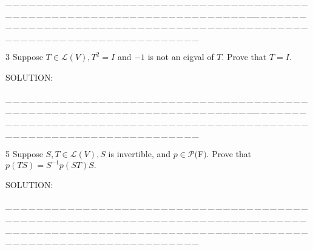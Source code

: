 \documentclass[a4paper, 11pt, UTF8]{article}
\def\Lm{\mathcal{L}}
\def\Po{\mathcal{P}}
\begin{document}
\begin{large}
\par
{\tiny \_\,\_\,\_\,\_\,\_\,\_\,\_\,\_\,\_\,\_\,\_\,\_\,\_\,\_\,\_\,\_\,\_\,\_\,\_\,\_\,\_\,\_\,\_\,\_\,\_\,\_\,\_\,\_\,\_\,\_\,\_\,\_\,\_\,\_\,\_\,\_\,\_\,\_\,\_\,\_\,\_\,\_\,\_\,\_\,\_\,\_\,\_\,\_\,\_\,\_\,\_\,\_\,\_\,\_\,\_\,\_\,\_\,\_\,\_\,\_\,\_\,\_\,\_\,\_\,\_\,\_\,\_\,\_\,\_\,\_\,\_\_\,\_\,\_\,\_\,\_\,\_\,\_\,\_\,\_\,\_\,\_\,\_\,\_\,\_\,\_\,\_\,\_\,\_\,\_\,\_\,\_\,\_\,\_\,\_\,\_\,\_\,\_\,\_\,\_\,\_\,\_\,\_\,\_\,\_\,\_\,\_\,\_\,\_\,\_\,\_\,\_\,\_\,\_\,\_\,\_\,\_\,\_\,\_\,\_\,\_\,\_\,\_\,\_\,\_\,\_\,\_\,\_\,\_\,\_\,\_\,\_\,\_\,\_\,\_\,\_\,\_\,\_\,\_\,\_\,\_\,\_}\par

{\timesbf\Large 3} {\timessl\Large 
Suppose $T\in\Lm(V),T^2=I$ and $-1$ is not an eigval of $T.$ Prove that $T=I.$
}\par
{\timesbf S\footnotesize{OLUTION:}}\par\quad

\par
{\tiny \_\,\_\,\_\,\_\,\_\,\_\,\_\,\_\,\_\,\_\,\_\,\_\,\_\,\_\,\_\,\_\,\_\,\_\,\_\,\_\,\_\,\_\,\_\,\_\,\_\,\_\,\_\,\_\,\_\,\_\,\_\,\_\,\_\,\_\,\_\,\_\,\_\,\_\,\_\,\_\,\_\,\_\,\_\,\_\,\_\,\_\,\_\,\_\,\_\,\_\,\_\,\_\,\_\,\_\,\_\,\_\,\_\,\_\,\_\,\_\,\_\,\_\,\_\,\_\,\_\,\_\,\_\,\_\,\_\,\_\,\_\_\,\_\,\_\,\_\,\_\,\_\,\_\,\_\,\_\,\_\,\_\,\_\,\_\,\_\,\_\,\_\,\_\,\_\,\_\,\_\,\_\,\_\,\_\,\_\,\_\,\_\,\_\,\_\,\_\,\_\,\_\,\_\,\_\,\_\,\_\,\_\,\_\,\_\,\_\,\_\,\_\,\_\,\_\,\_\,\_\,\_\,\_\,\_\,\_\,\_\,\_\,\_\,\_\,\_\,\_\,\_\,\_\,\_\,\_\,\_\,\_\,\_\,\_\,\_\,\_\,\_\,\_\,\_\,\_\,\_\,\_}\par



{\timesbf\Large 5} {\timessl\Large 
Suppose $S,T\in\Lm(V),S$ is invertible, and $p\in\Po(${\timesbf F}$)$. Prove that $p(TS) = S^{-1} p(ST)S.$
}\par
{\timesbf S\footnotesize{OLUTION:}}\par\quad

\par
{\tiny \_\,\_\,\_\,\_\,\_\,\_\,\_\,\_\,\_\,\_\,\_\,\_\,\_\,\_\,\_\,\_\,\_\,\_\,\_\,\_\,\_\,\_\,\_\,\_\,\_\,\_\,\_\,\_\,\_\,\_\,\_\,\_\,\_\,\_\,\_\,\_\,\_\,\_\,\_\,\_\,\_\,\_\,\_\,\_\,\_\,\_\,\_\,\_\,\_\,\_\,\_\,\_\,\_\,\_\,\_\,\_\,\_\,\_\,\_\,\_\,\_\,\_\,\_\,\_\,\_\,\_\,\_\,\_\,\_\,\_\,\_\_\,\_\,\_\,\_\,\_\,\_\,\_\,\_\,\_\,\_\,\_\,\_\,\_\,\_\,\_\,\_\,\_\,\_\,\_\,\_\,\_\,\_\,\_\,\_\,\_\,\_\,\_\,\_\,\_\,\_\,\_\,\_\,\_\,\_\,\_\,\_\,\_\,\_\,\_\,\_\,\_\,\_\,\_\,\_\,\_\,\_\,\_\,\_\,\_\,\_\,\_\,\_\,\_\,\_\,\_\,\_\,\_\,\_\,\_\,\_\,\_\,\_\,\_\,\_\,\_\,\_\,\_\,\_\,\_\,\_\,\_}\par


\end{large}
\end{document}
